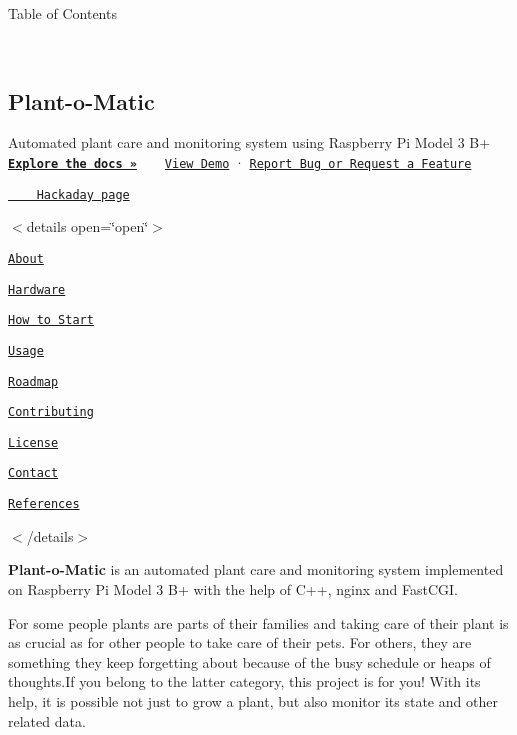 Table of Contents

~\newline
 

\href{https://github.com/atuatohu/Plant-o-Matic}{\tt }

\subsection*{Plant-\/o-\/\+Matic}

Automated plant care and monitoring system using Raspberry Pi Model 3 B+ ~\newline
 \href{https://github.com/atuatohu/Plant-o-Matic}{\tt {\bfseries Explore the docs »}} ~\newline
 ~\newline
 \href{https://github.com/atuatohu/Plant-o-Matic}{\tt View Demo} · \href{https://github.com/atuatohu/Plant-o-Matic/issues}{\tt Report Bug or Request a Feature} 

\href{https://www.youtube.com/watch?v=Qye0ZrwYpE0}{\tt ~~~  Hackaday page}  

$<$details open=\char`\"{}open\char`\"{}$>$


\begin{DoxyEnumerate}
\item \href{#about}{\tt About} 
\item \href{#hardware}{\tt Hardware} 
\item \href{#how-to-start}{\tt How to Start} 
\item \href{#how-to-start}{\tt Usage} 
\item \href{#roadmap}{\tt Roadmap} 
\item \href{#contributing}{\tt Contributing} 
\item \href{#license}{\tt License} 
\item \href{#contact}{\tt Contact} 
\item \href{#references}{\tt References} 
\end{DoxyEnumerate}$<$/details$>$

{\bfseries Plant-\/o-\/\+Matic} is an automated plant care and monitoring system implemented on Raspberry Pi Model 3 B+ with the help of C++, nginx and Fast\+C\+GI.

For some people plants are parts of their families and taking care of their plant is as crucial as for other people to take care of their pets. For others, they are something they keep forgetting about because of the busy schedule or heaps of thoughts.\+If you belong to the latter category, this project is for you! With it\textquotesingle{}s help, it is possible not just to grow a plant, but also monitor it\textquotesingle{}s state and other related data.

